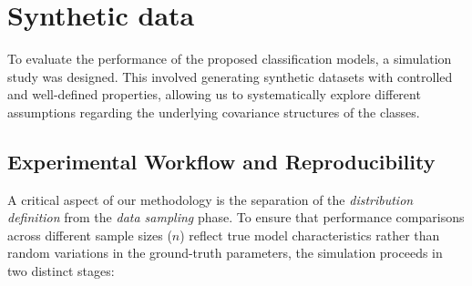 \documentclass[a4paper,11pt,twoside]{report}
\theoremstyle{definition}
\begin{document}
%
%
%
%
%

\section{Synthetic data}
\label{sec:synthetic_data}

To evaluate the performance of the proposed classification models, a simulation study was designed. This involved generating synthetic datasets with controlled and well-defined properties, allowing us to systematically explore different assumptions regarding the underlying covariance structures of the classes.

\subsection{Experimental Workflow and Reproducibility}

A critical aspect of our methodology is the separation of the \textit{distribution definition} from the \textit{data sampling} phase. To ensure that performance comparisons across different sample sizes ($n$) reflect true model characteristics rather than random variations in the ground-truth parameters, the simulation proceeds in two distinct stages:
\end{document}
